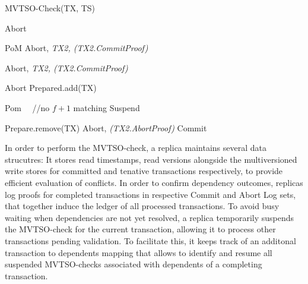 \begin{algorithm}
\caption{MVTSO-Check(TX, TS)}\label{mvtso}
\begin{algorithmic}[1]
\State \Return Abort
\EndIf

	 \Return PoM
	\EndIf
          \State  \Return Abort, \textit{TX2, (TX2.CommitProof)}  
         \EndIf  
\EndFor

          \State  \Return Abort, \textit{TX2, (TX2.CommitProof)}
         
        \EndIf
          \State  \Return Abort
       \EndIf
\EndFor
\State Prepared.add(TX) 

 \Return Pom ~~//no $f+1$ matching
\EndIf
{}
\State Suspend
\EndWhile

		\State	Prepare.remove(TX)
		\State \Return Abort, \textit{(TX2.AbortProof)}
		\EndIf
\EndFor
\State \Return Commit
\end{algorithmic}

\end{algorithm}

In order to perform the MVTSO-check, a replica maintains several data strucutres: \one It stores read timestamps, read versions alongside the multiversioned write stores for committed and tenative transactions respectively, to provide efficient evaluation of conflicts.
\two In order to confirm dependency outcomes, replicas log proofs for completed transactions in respective Commit and Abort Log sets, that together induce the ledger of all processed transactions. 
\three To avoid busy waiting when dependencies are not yet resolved, a replica temporarily suspends the MVTSO-check for the current transaction, allowing it to process other transactions pending validation. To facilitate this, it keeps track of an additonal transaction to dependents mapping that allows to identify and resume all suspended MVTSO-checks associated with dependents of a completing transaction.

